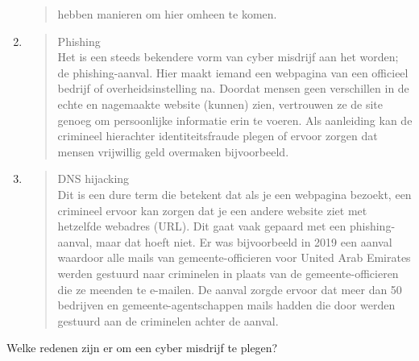 \documentclass[
]{article}
\begin{document}
\begin{enumerate}
\begin{quote}
  hebben manieren om hier omheen te komen.
  \end{quote}
\item
  \begin{quote}
  Phishing\\
  Het is een steeds bekendere vorm van cyber misdrijf aan het worden; de
  phishing-aanval. Hier maakt iemand een webpagina van een officieel
  bedrijf of overheidsinstelling na. Doordat mensen geen verschillen in
  de echte en nagemaakte website (kunnen) zien, vertrouwen ze de site
  genoeg om persoonlijke informatie erin te voeren. Als aanleiding kan
  de crimineel hierachter identiteitsfraude plegen of ervoor zorgen dat
  mensen vrijwillig geld overmaken bijvoorbeeld.
  \end{quote}
\item
  \begin{quote}
  DNS hijacking\\
  Dit is een dure term die betekent dat als je een webpagina bezoekt,
  een crimineel ervoor kan zorgen dat je een andere website ziet met
  hetzelfde webadres (URL). Dit gaat vaak gepaard met een
  phishing-aanval, maar dat hoeft niet. Er was bijvoorbeeld in 2019 een
  aanval waardoor alle mails van gemeente-officieren voor United Arab
  Emirates werden gestuurd naar criminelen in plaats van de
  gemeente-officieren die ze meenden te e-mailen. De aanval zorgde
  ervoor dat meer dan 50 bedrijven en gemeente-agentschappen mails
  hadden die door werden gestuurd aan de criminelen achter de aanval.
  \end{quote}
\end{enumerate}

Welke redenen zijn er om een cyber misdrijf te plegen?
\end{document}
